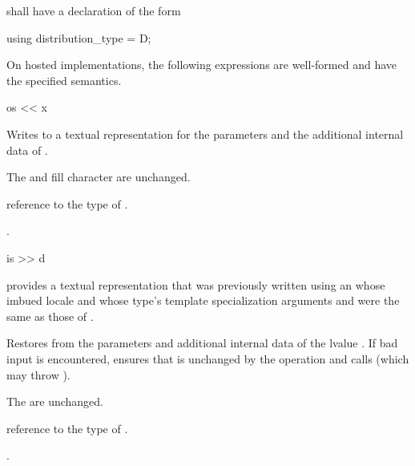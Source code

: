 \pnum
{} shall have a declaration of the form
\begin{codeblock}
using distribution_type =  D;
\end{codeblock}

\pnum
On hosted implementations,
the following expressions are well-formed and have the specified semantics.

\begin{itemdecl}
os << x
\end{itemdecl}

\begin{itemdescr}
\pnum
\effects
Writes to  a textual representation
for the parameters and the additional internal data of .

\pnum
\ensures
The  and fill character are unchanged.

\pnum
\result
reference to the type of .

\pnum
\returns
{}.
\end{itemdescr}

\begin{itemdecl}
is >> d
\end{itemdecl}

\begin{itemdescr}
\pnum
\expects
{} provides a textual representation
that was previously written
using an  whose imbued locale
and whose type's template specialization arguments
 and 
were the same as those of .

\pnum
\effects
Restores from 
the parameters and additional internal data of the lvalue .
If bad input is encountered,
ensures that  is unchanged by the operation
and
calls 
(which may throw ).

\pnum
\ensures
The  are unchanged.

\pnum
\result
reference to the type of .

\pnum
\returns
{}.
\end{itemdescr}

%
%




